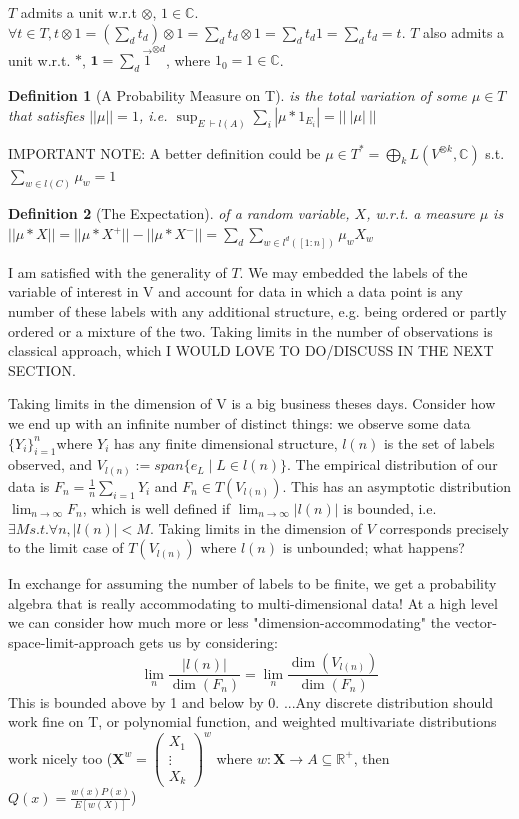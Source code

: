 \documentclass{article}
\newtheorem*{definition}{Definition}
\begin{document}
$T$ admits a unit w.r.t $\otimes$, $1\in \mathbb{C}$. $\forall t \in T, t\otimes 1 = (\sum_d t_d)\otimes 1 = \sum_d t_d\otimes 1 = \sum_d t_d1 = \sum_d t_d = t$. 
$T$ also admits a unit w.r.t. $*$, $\mathbf{1} = \sum_d \vec{1}^{\otimes d}$, where $1_0 = 1\in\mathbb{C}$.

\begin{definition}[A Probability Measure on T] is the total variation of some $\mu\in T$ that satisfies $||\mu|| = 1 $, i.e. $\sup_{E\: \vdash l(A)} \sum_i |\mu * 1_{E_i}| =||\:|\mu|\: ||$ \end{definition} 

IMPORTANT NOTE: A better definition could be $\mu\in T^* = \bigoplus_k L(V^{\otimes k},\mathbb{C}) $ s.t. $\sum_{w\in l(C)}\mu_w = 1$

\begin{definition}[The Expectation] of a random variable, $X$, w.r.t. a measure $\mu$ is $  ||\mu *X ||= ||\mu* X^+||- ||\mu* X^-|| = \sum_d \sum_{w\in l^d([1:n])} \mu_w X_w$  \end{definition}

I am satisfied with the generality of $T$. We may embedded the labels of the variable of interest in V and account for data in which a data point is any number of these labels with any additional structure, e.g. being ordered or partly ordered or a mixture of the two. Taking limits in the number of observations is classical approach, which I WOULD LOVE TO DO/DISCUSS IN THE NEXT SECTION. 

Taking limits in the dimension of V is a big business theses days. Consider how we end up with an infinite number of distinct things: we observe some data $\{Y_i\}^n_{i=1}$where $Y_i$ has any finite dimensional structure, $l(n)$ is the set of labels observed, and $V_{l(n)} := span\{e_L\mid L \in l(n)\}$. The empirical distribution of our data is $ F_n = \frac{1}{n}\sum_{i=1} Y_i$ and $F_n \in T(V_{l(n)})$. This has an asymptotic distribution $\lim_{n\rightarrow \infty} F_n$, which is well defined if $\lim_{n\rightarrow\infty} |l(n)|$ is bounded, i.e. $\exists M s.t. \forall n, |l(n)| < M$. Taking limits in the dimension of $V$ corresponds precisely to the limit case of $T(V_{l(n)})$ where $l(n)$ is unbounded; what happens?

In exchange for assuming the number of labels to be finite, we get a probability algebra that is really accommodating to multi-dimensional data! At a high level we can consider how much more or less "dimension-accommodating" the vector-space-limit-approach gets us by considering:
\[ \lim_n \frac{|l(n)|}{\dim(F_n)} = \lim_n \frac{ \dim(V_{l(n)})}{\dim(F_n)} \]This is bounded above by 1 and below by 0.
...Any discrete distribution should work fine on T,
or polynomial function,
and weighted multivariate distributions work nicely too 
($\mathbf{X}^w = \begin{pmatrix} X_1 \\ \vdots \\ X_k\end{pmatrix}^w$ where $w:\mathbf{X}\rightarrow A\subseteq\mathbb{R}^+$, then $Q(x)=\frac{w(x)P(x)}{E[w(X)]}$)
\end{document}
